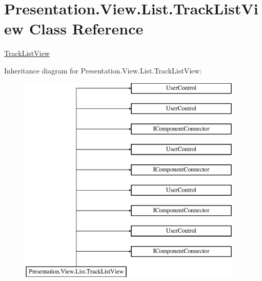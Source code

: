 \hypertarget{class_presentation_1_1_view_1_1_list_1_1_track_list_view}{}\section{Presentation.\+View.\+List.\+Track\+List\+View Class Reference}
\label{class_presentation_1_1_view_1_1_list_1_1_track_list_view}


\hyperlink{class_presentation_1_1_view_1_1_list_1_1_track_list_view}{Track\+List\+View}  


Inheritance diagram for Presentation.\+View.\+List.\+Track\+List\+View\+:\begin{figure}[H]
\begin{center}
\leavevmode
\includegraphics[height=10.000000cm]{class_presentation_1_1_view_1_1_list_1_1_track_list_view}
\end{center}
\end{figure}
